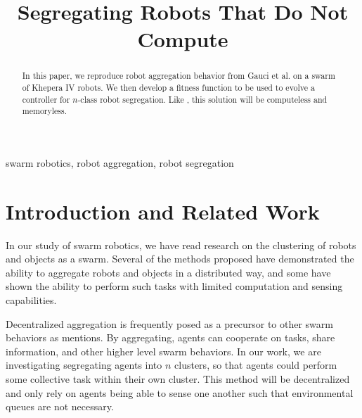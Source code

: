 \documentclass[conference]{IEEEtran}
\begin{document}
\title{Segregating Robots That Do Not Compute}

\author{
\and
{}
\and
{}
}

\maketitle

\begin{abstract}
  In this paper, we reproduce robot aggregation behavior from Gauci et al. \cite{gauci_self-organized_2014} on a swarm of Khepera IV robots. We then develop a fitness function to be used to evolve a controller for $n$-class robot segregation. Like \cite{gauci_self-organized_2014}, this solution will be computeless and memoryless.
\end{abstract}

\begin{IEEEkeywords}
  swarm robotics, robot aggregation, robot segregation
\end{IEEEkeywords}

\section{Introduction and Related Work}
  In our study of swarm robotics, we have read research on the clustering of robots and objects as a swarm.  Several of the methods proposed have demonstrated the ability to aggregate robots and objects in a distributed way, and some have shown the ability to perform such tasks with limited computation and sensing capabilities.

  Decentralized aggregation is frequently posed as a precursor to other swarm behaviors as \cite{gauci_evolving_2014} mentions. By aggregating, agents can cooperate on tasks, share information, and other higher level swarm behaviors.  In our work, we are investigating segregating agents into $n$ clusters, so that agents could perform some collective task within their own cluster.  This method will be decentralized and only rely on agents being able to sense one another such that environmental queues are not necessary.
\end{document}
